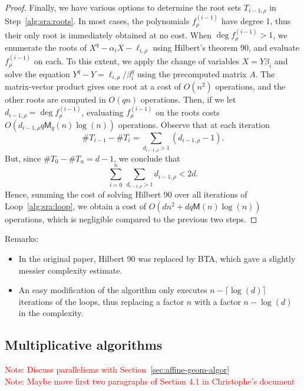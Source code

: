 \documentclass{article}
\newcommand{\Mul}{\mathsf{M}}
\newcounter{algo}
\newcommand{\Notes}[1]{\textcolor{red}{Note: #1}}
\begin{document}
\begin{proof}
  Finally, we have various options to determine the root sets
  $T_{i-1,\rho}$ in Step~\ref{alg:sra:roots}. %
  In most cases, the polynomials $f_\rho^{(i-1)}$ have degree 1, thus
  their only root is immediately obtained at no cost. %
  When $\deg f_\rho^{(i-1)}>1$, we enumerate the roots of
  $X^q-\alpha_iX-\ell_{i,\rho}$ using Hilbert's theorem 90, and
  evaluate $f_\rho^{(i-1)}$ on each. %
  To this extent, we apply the change of variables $X=Y\beta_i$ and
  solve the equation $Y^q-Y=\ell_{i,\rho}/\beta_i^q$ using the
  precomputed matrix $A$. %
  The matrix-vector product gives one root at a cost of $O(n^2)$
  operations, and the other roots are computed in $O(qn)$
  operations. %
  Then, if we let $d_{i-1,\rho}=\deg f_\rho^{(i-1)}$, evaluating
  $f_\rho^{(i-1)}$ on the roots costs
  $O(d_{i-1,\rho}q\Mul_q(n)\log(n))$ operations. %
  Observe that at each iteration
  \[\#T_{i-1}-\#T_i = \sum_{d_{i-1,\rho}>1} (d_{i-1,\rho}-1).\]
  But, since $\#T_0-\#T_n=d-1$, we conclude that
  \[\sum_{i=0}^n\,\sum_{d_{i-1,\rho}>1}d_{i-1,\rho}<2d.\]
  Hence, summing the cost of solving Hilbert 90 over all iterations of
  Loop~\ref{alg:sra:loop}, we obtain a cost of
  $O(dn^2+dq\Mul(n)\log(n))$ operations, which is negligible compared
  to the previous two steps.
\end{proof}

Remarks:
\begin{itemize}
\item In the original paper, Hilbert 90 was replaced by BTA, which
  gave a slightly messier complexity estimate.
\item An easy modification of the algorithm only executes
  $n-\lceil\log(d)\rceil$ iterations of the loops, thus replacing a
  factor $n$ with a factor $n-\log(d)$ in the complexity.
\end{itemize}










\subsection{Multiplicative algorithms}
\label{sec:mult-algor}
\Notes{Discuss parallelisms with Section~\ref{sec:affine-geom-algor}}\\
\noindent\Notes{Maybe move first two paragraphs of Section 4.1 in Christophe's document}
\end{document}
